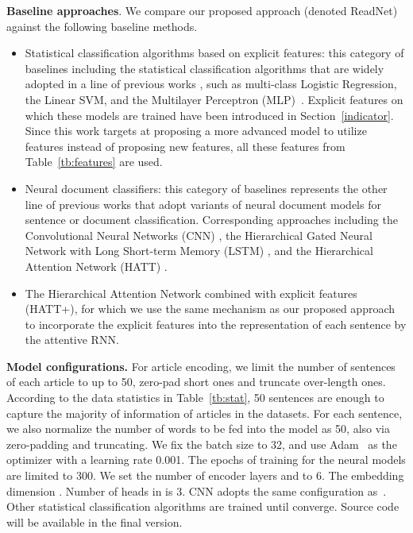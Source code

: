 \documentclass[runningheads]{llncs}
\begin{document}
\textbf{Baseline approaches}. We compare our proposed approach (denoted ReadNet) against the following baseline methods.
\begin{itemize}
	\item Statistical classification algorithms based on explicit features: this category of baselines including the statistical classification algorithms that are widely adopted in a line of previous works \cite{ReadingMeasures,SVM,collins2005predicting,pitler2008revisiting,pilan2016predicting,CambridgeData}, such as  multi-class Logistic Regression, the Linear SVM, and the Multilayer Perceptron (MLP)~\cite{weebit}. 
Explicit features on which these models are trained have been introduced in Section~\ref{indicator}.
Since this work targets at proposing  a  more  advanced  model to utilize features instead of proposing new features, all these features from Table~\ref{tb:features} are used.

  \item Neural document classifiers: this category of baselines represents the other line of previous works that adopt variants of neural document models for sentence or document classification.
      Corresponding approaches including the Convolutional Neural Networks (CNN) \cite{CNN}, the Hierarchical Gated Neural Network with Long Short-term Memory (LSTM) \cite{tang2015document}, and the Hierarchical Attention Network (HATT) \cite{RNN}.
  	\item The Hierarchical Attention Network combined with explicit features (HATT+), for which we use the same mechanism as our proposed approach to incorporate the explicit features into the representation of each sentence by the attentive RNN.
\end{itemize}

\textbf{Model configurations.}  
For article encoding, we limit the number of sentences of each article to up to 50, zero-pad short ones and truncate over-length ones. According to the data statistics in Table~\ref{tb:stat}, 50 sentences are enough to capture the majority of information of articles in the datasets. For each sentence, we also normalize the number of words to be fed into the model as 50, also via zero-padding and truncating. We fix the batch size to 32, and use Adam~\cite{duchi2011adaptive} as the optimizer with a learning rate 0.001. The epochs of training for the neural models are limited to 300. We set the number of encoder layers  and  to 6. The embedding dimension . Number of heads  in  is 3. CNN adopts the same configuration as~\cite{CNN}. Other statistical classification algorithms are trained until converge. Source code will be available in the final version.
\end{document}
